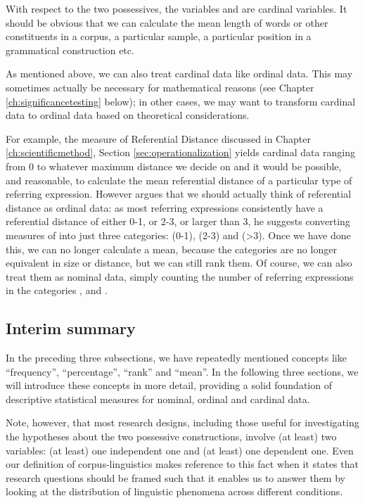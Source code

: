 With respect to the two possessives, the variables  and  are cardinal variables. It should be obvious that we can calculate the mean length of words or other constituents in a corpus, a particular sample, a particular position in a grammatical construction etc.

As mentioned above, we can also treat cardinal data like ordinal data. This may sometimes actually be necessary for mathematical reasons (see Chapter \ref{ch:significancetesting} below); in other cases, we may want to transform cardinal data to ordinal data based on theoretical considerations.

For example, the measure of Referential Distance discussed in Chapter \ref{ch:scientificmethod}, Section \ref{sec:operationalization} yields cardinal data ranging from 0 to whatever maximum distance we decide on and it would be possible, and reasonable, to calculate the mean referential distance of a particular type of referring expression. However \citep[20ff]{givon_grammar_1992} argues that we should actually think of referential distance as ordinal data: as most referring expressions consistently have a referential distance of either 0-1, or 2-3, or larger than 3, he suggests converting measures of  into just three categories:  (0-1),  (2-3) and  (>3). Once we have done this, we can no longer calculate a mean, because the categories are no longer equivalent in size or distance, but we can still rank them. Of course, we can also treat them as nominal data, simply counting the number of referring expressions in the categories  ,  and .

\subsection{Interim summary}
\label{sec:datatypesinterim}

In the preceding three subsections, we have repeatedly mentioned concepts like ``frequency'', ``percentage'', ``rank'' and ``mean''. In the following three sections, we will introduce these concepts in more detail, providing a solid foundation of descriptive statistical measures for nominal, ordinal and cardinal data.

Note, however, that most research designs, including those useful for investigating the hypotheses about the two possessive constructions, involve (at least) two variables: (at least) one independent one and (at least) one dependent one. Even our definition of corpus-linguistics makes reference to this fact when it states that research questions should be framed such that it enables us to answer them by looking at the distribution of linguistic phenomena across different conditions.

